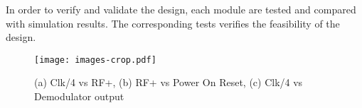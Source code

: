 In order to verify and validate the design, each module are tested and compared with simulation results. The corresponding tests verifies the feasibility of the design. 

\begin{figure}[h]
  \centering
  \texttt{[image: images-crop.pdf]}
  \caption{(a) Clk/4 vs RF+, (b) RF+ vs Power On Reset, (c) Clk/4 vs Demodulator output}
  \label{fig:meas}
\end{figure}